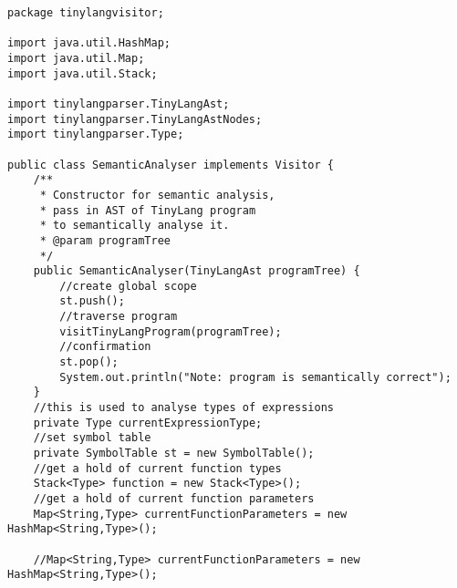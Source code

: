 \begin{lstlisting}[basicstyle=\miniscule,caption=Semantic Analyser,label=listing:semanticanalyser]
package tinylangvisitor;

import java.util.HashMap;
import java.util.Map;
import java.util.Stack;

import tinylangparser.TinyLangAst;
import tinylangparser.TinyLangAstNodes;
import tinylangparser.Type;

public class SemanticAnalyser implements Visitor {
	/**
	 * Constructor for semantic analysis,
	 * pass in AST of TinyLang program
	 * to semantically analyse it.
	 * @param programTree
	 */
	public SemanticAnalyser(TinyLangAst programTree) {
		//create global scope
		st.push();
		//traverse program
		visitTinyLangProgram(programTree);
		//confirmation
		st.pop();
		System.out.println("Note: program is semantically correct");	
	}
	//this is used to analyse types of expressions
	private Type currentExpressionType;
	//set symbol table
	private SymbolTable st = new SymbolTable();
	//get a hold of current function types
	Stack<Type> function = new Stack<Type>();
	//get a hold of current function parameters
	Map<String,Type> currentFunctionParameters = new HashMap<String,Type>();

	//Map<String,Type> currentFunctionParameters = new HashMap<String,Type>();
	

\end{lstlisting}
